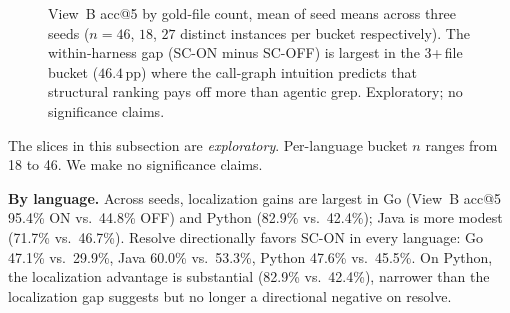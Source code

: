 \begin{figure}[!tbp]
  \centering
  \caption{View~B acc@5 by gold-file count, mean of seed means across three seeds
  ($n{=}46$, $18$, $27$ distinct instances per bucket respectively). The within-harness
  gap (SC-ON minus SC-OFF) is largest in the 3+\,file bucket
  ($46.4$\,pp) where the call-graph intuition predicts that structural ranking pays
  off more than agentic grep. Exploratory; no significance claims.}
  \label{fig:filecount}
\end{figure}

The slices in this subsection are \emph{exploratory}. Per-language bucket $n$ ranges from
18 to 46. We make no significance claims.

\textbf{By language.} Across seeds, localization gains are largest in Go (View~B acc@5
95.4\% ON vs.\ 44.8\% OFF) and Python (82.9\% vs.\ 42.4\%); Java is more modest (71.7\%
vs.\ 46.7\%). Resolve directionally favors SC-ON in every language: Go 47.1\% vs.\
29.9\%, Java 60.0\% vs.\ 53.3\%, Python 47.6\% vs.\ 45.5\%. On Python, the localization
advantage is substantial (82.9\% vs.\ 42.4\%), narrower than the localization gap
suggests but no longer a directional negative on resolve.

